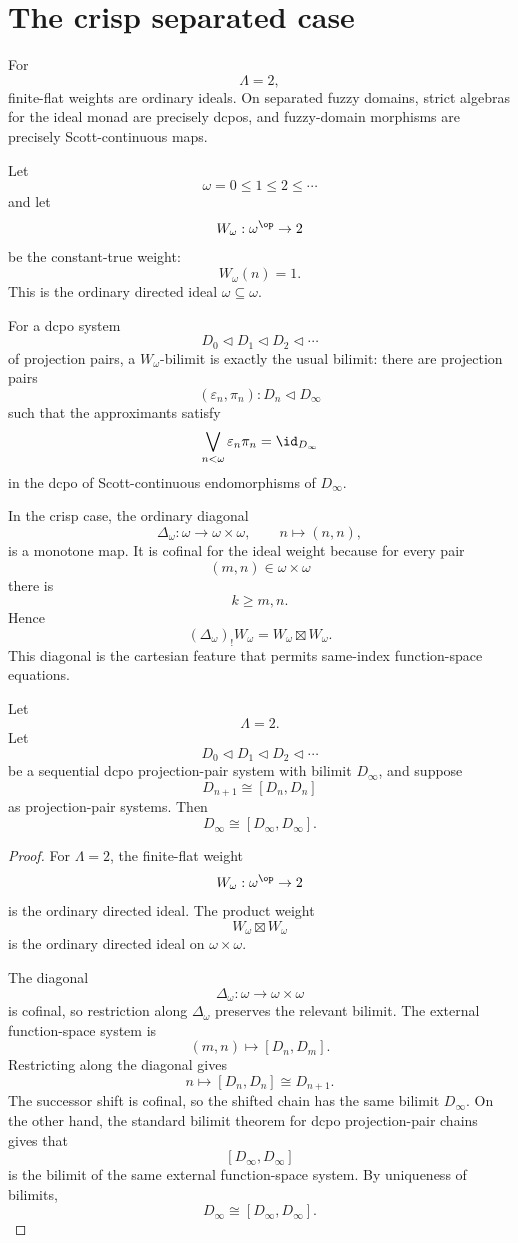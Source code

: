 \section{The crisp separated case}
\label{sec:crisp-separated-ff-rde}

For
\[
    \Lambda=2,
\]
finite-flat weights are ordinary ideals.  On separated fuzzy domains, strict
algebras for the ideal monad are precisely dcpos, and fuzzy-domain morphisms
are precisely Scott-continuous maps.

Let
\[
    \omega=0\leq1\leq2\leq\cdots
\]
and let
\[
    W_\omega:\omega^{\op}\to 2
\]
be the constant-true weight:
\[
    W_\omega(n)=1.
\]
This is the ordinary directed ideal \(\omega\subseteq\omega\).

For a dcpo system
\[
    D_0\triangleleft D_1\triangleleft D_2\triangleleft\cdots
\]
of projection pairs, a \(W_\omega\)-bilimit is exactly the usual bilimit:
there are projection pairs
\[
    (\varepsilon_n,\pi_n):D_n\triangleleft D_\infty
\]
such that the approximants satisfy
\[
    \bigvee_{n<\omega}
        \varepsilon_n\pi_n
    =
    \id_{D_\infty}
\]
in the dcpo of Scott-continuous endomorphisms of \(D_\infty\).

In the crisp case, the ordinary diagonal
\[
    \Delta_\omega:\omega\to\omega\times\omega,
    \qquad
    n\longmapsto(n,n),
\]
is a monotone map.  It is cofinal for the ideal weight because for every pair
\[
    (m,n)\in\omega\times\omega
\]
there is
\[
    k\geq m,n.
\]
Hence
\[
    (\Delta_\omega)_!W_\omega
    =
    W_\omega\boxtimes W_\omega.
\]
This diagonal is the cartesian feature that permits same-index function-space
equations.

\begin{theorem}
\label{thm:crisp-separated-same-index-collapse}
Let
\[
    \Lambda=2.
\]
Let
\[
    D_0\triangleleft D_1\triangleleft D_2\triangleleft\cdots
\]
be a sequential dcpo projection-pair system with bilimit \(D_\infty\), and
suppose
\[
    D_{n+1}\cong [D_n,D_n]
\]
as projection-pair systems.  Then
\[
    D_\infty\cong [D_\infty,D_\infty].
\]
\end{theorem}

\begin{proof}
For \(\Lambda=2\), the finite-flat weight
\[
    W_\omega:\omega^{\op}\to 2
\]
is the ordinary directed ideal.  The product weight
\[
    W_\omega\boxtimes W_\omega
\]
is the ordinary directed ideal on \(\omega\times\omega\).

The diagonal
\[
    \Delta_\omega:\omega\to\omega\times\omega
\]
is cofinal, so restriction along \(\Delta_\omega\) preserves the relevant
bilimit.  The external function-space system is
\[
    (m,n)\longmapsto [D_n,D_m].
\]
Restricting along the diagonal gives
\[
    n\longmapsto [D_n,D_n]\cong D_{n+1}.
\]
The successor shift is cofinal, so the shifted chain has the same bilimit
\(D_\infty\).  On the other hand, the standard bilimit theorem for dcpo
projection-pair chains gives that
\[
    [D_\infty,D_\infty]
\]
is the bilimit of the same external function-space system.  By uniqueness of
bilimits,
\[
    D_\infty\cong [D_\infty,D_\infty].
\]
\end{proof}

